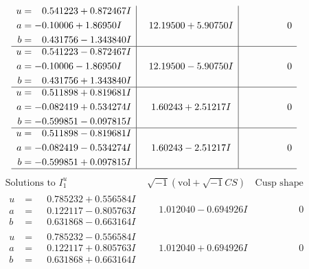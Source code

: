 \documentclass[1p]{elsarticle_modified}
\theoremstyle{definition}
\newcommand{\I}{\sqrt{-1}}
\begin{document}
$$\begin{array}{c|c|c}
\begin{aligned}
u &= \phantom{-}0.541223 + 0.872467 I \\
a &= -0.10006 + 1.86950 I \\
b &= \phantom{-}0.431756 - 1.343840 I\end{aligned}
 & \phantom{-}12.19500 + 5.90750 I & \phantom{-0.000000 } 0 \\ \hline\begin{aligned}
u &= \phantom{-}0.541223 - 0.872467 I \\
a &= -0.10006 - 1.86950 I \\
b &= \phantom{-}0.431756 + 1.343840 I\end{aligned}
 & \phantom{-}12.19500 - 5.90750 I & \phantom{-0.000000 } 0 \\ \hline\begin{aligned}
u &= \phantom{-}0.511898 + 0.819681 I \\
a &= -0.082419 + 0.534274 I \\
b &= -0.599851 - 0.097815 I\end{aligned}
 & \phantom{-}1.60243 + 2.51217 I & \phantom{-0.000000 } 0 \\ \hline\begin{aligned}
u &= \phantom{-}0.511898 - 0.819681 I \\
a &= -0.082419 - 0.534274 I \\
b &= -0.599851 + 0.097815 I\end{aligned}
 & \phantom{-}1.60243 - 2.51217 I & \phantom{-0.000000 } 0\\
 \hline 
 \end{array}$$\newpage$$\begin{array}{c|c|c}  
\text{Solutions to }I^u_{1}& \I (\text{vol} + \sqrt{-1}CS) & \text{Cusp shape}\\
 \hline 
\begin{aligned}
u &= \phantom{-}0.785232 + 0.556584 I \\
a &= \phantom{-}0.122117 - 0.805763 I \\
b &= \phantom{-}0.631868 - 0.663164 I\end{aligned}
 & \phantom{-}1.012040 - 0.694926 I & \phantom{-0.000000 } 0 \\ \hline\begin{aligned}
u &= \phantom{-}0.785232 - 0.556584 I \\
a &= \phantom{-}0.122117 + 0.805763 I \\
b &= \phantom{-}0.631868 + 0.663164 I\end{aligned}
 & \phantom{-}1.012040 + 0.694926 I & \phantom{-0.000000 } 0 \\ \hline\begin{aligned}

\end{aligned}
\end{array}$$
\end{document}
